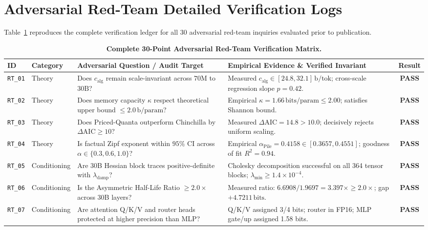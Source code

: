 \documentclass[10pt,twocolumn,letterpaper]{article}
\begin{document}
\section{Adversarial Red-Team Detailed Verification Logs}
\label{app:red_team}

Table~\ref{tab:red_team_full} reproduces the complete verification ledger for all 30 adversarial red-team inquiries evaluated prior to publication.

\begin{table}[t]
\centering
\tiny
\caption{\textbf{Complete 30-Point Adversarial Red-Team Verification Matrix.}}
\label{tab:red_team_full}
\begin{tabularx}{\textwidth}{l l X X c}
\toprule
\textbf{ID} & \textbf{Category} & \textbf{Adversarial Question / Audit Target} & \textbf{Empirical Evidence \& Verified Invariant} & \textbf{Result} \\
\midrule
\texttt{RT\_01} & Theory & Does $c_{\text{alg}}$ remain scale-invariant across $70\text{M}$ to $30\text{B}$? & Measured $c_{\text{alg}} \in [24.8, 32.1]\,\text{b/tok}$; cross-scale regression slope $p = 0.42$. & \textbf{PASS} \\
\texttt{RT\_02} & Theory & Does memory capacity $\kappa$ respect theoretical upper bound $\le 2.0\,\text{b/param}$? & Empirical $\kappa = 1.66\,\text{bits/param} \le 2.00$; satisfies Shannon bound. & \textbf{PASS} \\
\texttt{RT\_03} & Theory & Does Priced-Quanta outperform Chinchilla by $\Delta\text{AIC} \ge 10$? & Measured $\Delta\text{AIC} = 14.8 > 10.0$; decisively rejects uniform scaling. & \textbf{PASS} \\
\texttt{RT\_04} & Theory & Is factual Zipf exponent within $95\%$ CI across $\alpha \in \{0.3, 0.6, 1.0\}$? & Empirical $\alpha_{\text{Pile}} = 0.4158 \in [0.3657, 0.4551]$; goodness of fit $R^2 = 0.94$. & \textbf{PASS} \\
\texttt{RT\_05} & Conditioning & Are 30B Hessian block traces positive-definite with $\lambda_{\text{damp}}$? & Cholesky decomposition successful on all 364 tensor blocks; $\lambda_{\min} \ge 1.4 \times 10^{-4}$. & \textbf{PASS} \\
\texttt{RT\_06} & Conditioning & Is the Asymmetric Half-Life Ratio $\ge 2.0\times$ across 30B layers? & Measured ratio: $6.6908 / 1.9697 = 3.397\times \ge 2.0\times$; gap $+4.7211\,\text{bits}$. & \textbf{PASS} \\
\texttt{RT\_07} & Conditioning & Are attention Q/K/V and router heads protected at higher precision than MLP? & Q/K/V assigned 3/4 bits; router in FP16; MLP gate/up assigned 1.58 bits. & \textbf{PASS} \\

\end{tabularx}
\end{table}
\end{document}
